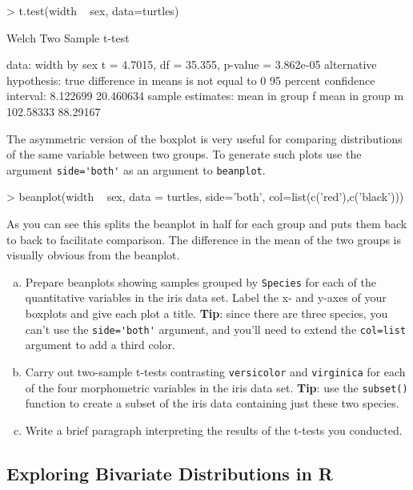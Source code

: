 \begin{R}
> t.test(width ~ sex, data=turtles)

        Welch Two Sample t-test

data:  width by sex 
t = 4.7015, df = 35.355, p-value = 3.862e-05
alternative hypothesis: true difference in means is not equal to 0 
95 percent confidence interval:
  8.122699 20.460634 
sample estimates:
mean in group f mean in group m 
      102.58333        88.29167 
\end{R}
The asymmetric version of the boxplot is very useful for comparing
distributions of the same variable between two groups. To generate such
plots use the argument \lstinline!side='both'! as an argument to
\lstinline!beanplot!.

\begin{R}
> beanplot(width ~ sex, data = turtles, side='both', col=list(c('red'),c('black')))  
\end{R}
As you can see this splits the beanplot in half for each group and puts
them back to back to facilitate comparison. The difference in the mean
of the two groups is visually obvious from the beanplot.

\begin{assignment}
\begin{enumerate}[a)]
\item
  Prepare beanplots showing samples grouped by \lstinline!Species! for
  each of the quantitative variables in the iris data set. Label the x-
  and y-axes of your boxplots and give each plot a title. \textbf{Tip}: since there are three species, you can't use the \lstinline!side='both'! argument, and you'll need to extend the \lstinline!col=list! argument to add a third color.

\item Carry out two-sample t-tests contrasting \lstinline!versicolor! and
  \lstinline!virginica! for each of the four morphometric variables in
  the iris data set. \textbf{Tip}: use the \lstinline!subset()! function to create a subset of the iris data containing just these two species.

\item Write a brief paragraph interpreting the results of the t-tests you
  conducted.
\end{enumerate}
\end{assignment}

\subsection{Exploring Bivariate Distributions in R}

